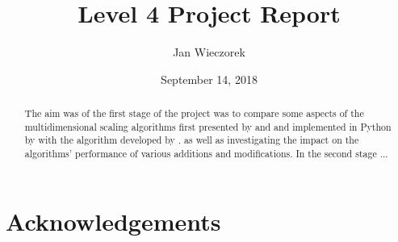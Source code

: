 \documentclass{l4proj}
\begin{document}
\title{Level 4 Project Report } %
\author{Jan Wieczorek}
\date{September 14, 2018}

\maketitle

\begin{abstract}
    The aim was of the first stage of the project was to compare some aspects of the multidimensional scaling algorithms first presented by \citet{Chalmers96} and \citet{hyrid} and implemented in Python by \citet{2019} with the algorithm developed by \citet{squad}. as well as investigating the impact on the algorithms' performance of various additions and modifications. In the second stage ...
\end{abstract}

\chapter*{Acknowledgements}
%
%


%
%
\def\consentname {Jan Wieczorek} %
\def\consentdate {10 March 2023} %
%
\educationalconsent


\tableofcontents
\end{document}
